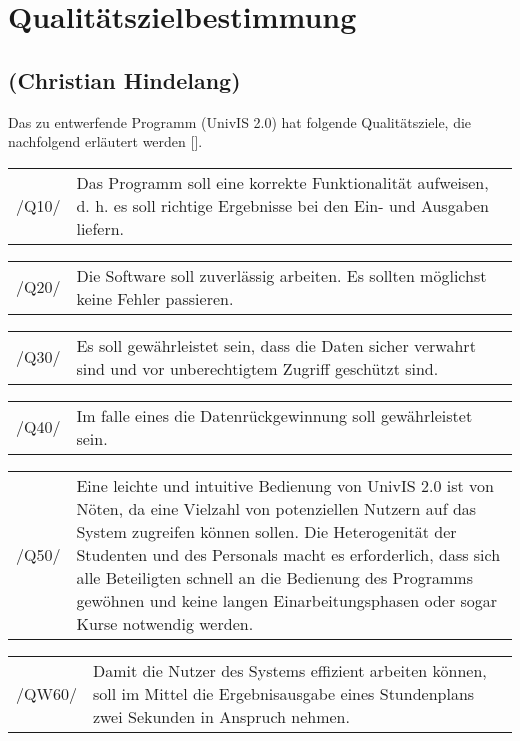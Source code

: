 \section{Qualitätszielbestimmung}
\label{sec:Qualitätszielbestimmung}

\subsection*{(Christian Hindelang)}

Das zu entwerfende Programm (UnivIS 2.0) hat folgende Qualitätsziele, die nachfolgend erläutert werden [\cite{UniRos12a}]. 

\begin{tabular}{p{1.5cm}p{14.5cm}}
 /Q10/	& Das Programm soll eine korrekte Funktionalität aufweisen, d. h. es soll richtige Ergebnisse bei den Ein- und Ausgaben liefern. \\[0.25cm]	 
\end{tabular}

\begin{tabular}{p{1.5cm}p{14.5cm}}
 /Q20/	& Die Software soll zuverlässig arbeiten. Es sollten möglichst keine Fehler passieren. \\[0.25cm]	 
 \end{tabular}

\begin{tabular}{p{1.5cm}p{14.5cm}}
 /Q30/	& Es soll gewährleistet sein, dass die Daten sicher verwahrt sind und vor unberechtigtem Zugriff geschützt sind. \\[0.25cm]	 
\end{tabular}

\begin{tabular}{p{1.5cm}p{14.5cm}}
 /Q40/	& Im falle eines die Datenrückgewinnung soll gewährleistet sein. \\[0.25cm]	 
\end{tabular}

\begin{tabular}{p{1.5cm}p{14.5cm}}
 /Q50/	& Eine leichte und intuitive Bedienung von UnivIS 2.0 ist von Nöten, da eine Vielzahl von potenziellen Nutzern auf das System zugreifen können sollen. Die Heterogenität der Studenten und des Personals macht es erforderlich, dass sich alle Beteiligten schnell an die Bedienung des Programms gewöhnen und keine langen Einarbeitungsphasen oder sogar Kurse notwendig werden. \\[0.25cm]	 
\end{tabular}

\begin{tabular}{p{1.5cm}p{14.5cm}}
 /QW60/	& Damit die Nutzer des Systems effizient arbeiten können, soll im Mittel die Ergebnisausgabe eines Stundenplans zwei Sekunden in Anspruch nehmen. \\[0.25cm]	 
\end{tabular}

